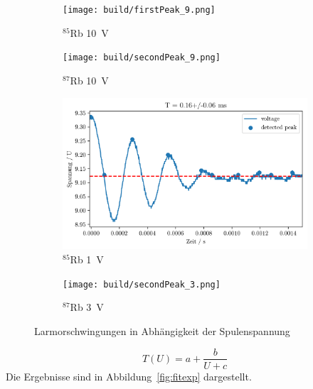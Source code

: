 \begin{figure}[h]
	\centering
	\begin{subfigure}[c]{0.45\textwidth}
	\begin{center}
		\texttt{[image: build/firstPeak\_9.png]}
	\end{center}
	\caption{$^{85}$Rb \SI{10}{\volt}}%
	\label{fig:}
	\end{subfigure}
	\begin{subfigure}[c]{0.45\textwidth}
	\begin{center}
		\texttt{[image: build/secondPeak\_9.png]}
	\end{center}
	\caption{$^{87}$Rb \SI{10}{\volt}}%
	\label{fig:}
	\end{subfigure}

	\begin{subfigure}[c]{0.45\textwidth}
	\begin{center}
		\includegraphics[width=\textwidth]{picture/firstPeak_3.png}
	\end{center}
	\caption{$^{85}$Rb \SI{1}{\volt}}%
	\label{fig:85a}
	\end{subfigure}
	\begin{subfigure}[c]{0.45\textwidth}
	\begin{center}
		\texttt{[image: build/secondPeak\_3.png]}
	\end{center}
	\caption{$^{87}$Rb \SI{3}{\volt}}%
	\label{fig:}
	\end{subfigure}
	\caption{Larmorschwingungen in Abhängigkeit der Spulenspannung}%
	\label{fig:periode}
\end{figure}
\begin{equation}
	\label{eq:fit}
	T(U) = a + \frac{b}{U + c}
\end{equation}
Die Ergebnisse sind in Abbildung~\ref{fig:fitexp} dargestellt.
